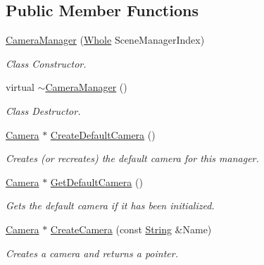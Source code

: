 \subsection*{Public Member Functions}
\begin{DoxyCompactItemize}
\item 
\hyperlink{classphys_1_1CameraManager_ae2d0ecf1130183393bb5c1e0b2d3169d}{CameraManager} (\hyperlink{namespacephys_a460f6bc24c8dd347b05e0366ae34f34a}{Whole} SceneManagerIndex)
\begin{DoxyCompactList}\small\item\em Class Constructor. \item\end{DoxyCompactList}\item 
virtual \hyperlink{classphys_1_1CameraManager_a0b0f032477309eb47b0302fd5eef198c}{$\sim$CameraManager} ()
\begin{DoxyCompactList}\small\item\em Class Destructor. \item\end{DoxyCompactList}\item 
\hyperlink{classphys_1_1Camera}{Camera} $\ast$ \hyperlink{classphys_1_1CameraManager_a80f7dd510a31264d74e7f5a53bdf86a9}{CreateDefaultCamera} ()
\begin{DoxyCompactList}\small\item\em Creates (or recreates) the default camera for this manager. \item\end{DoxyCompactList}\item 
\hyperlink{classphys_1_1Camera}{Camera} $\ast$ \hyperlink{classphys_1_1CameraManager_ad7ef5b6a4ca501729c2d5d107d1bf392}{GetDefaultCamera} ()
\begin{DoxyCompactList}\small\item\em Gets the default camera if it has been initialized. \item\end{DoxyCompactList}\item 
\hyperlink{classphys_1_1Camera}{Camera} $\ast$ \hyperlink{classphys_1_1CameraManager_a3681545c19a96ae62032204a6f4a602b}{CreateCamera} (const \hyperlink{namespacephys_aa03900411993de7fbfec4789bc1d392e}{String} \&Name)
\begin{DoxyCompactList}\small\item\em Creates a camera and returns a pointer. \item\end{DoxyCompactList}\item 

\end{DoxyCompactItemize}
